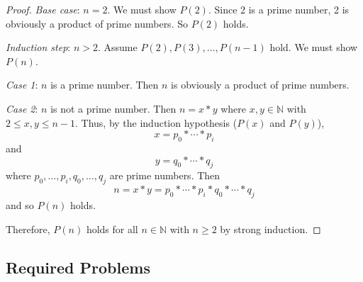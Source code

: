 \documentclass[11pt,fleqn]{article}
\begin{document}
\begin{enumerate}
\begin{proof}
\medskip

\emph{Base case}: $n = 2$.  We must show $P(2)$.  Since 2 is a prime
number, 2 is obviously a product of prime numbers.  So $P(2)$ holds.

\medskip

\emph{Induction step}: $n > 2$.  Assume $P(2), P(3), \ldots, P(n-1)$
hold.  We must show $P(n)$.

\emph{Case 1}: $n$ is a prime number.  Then $n$ is obviously a product
of prime numbers.

\emph{Case 2}: $n$ is not a prime number.  Then $n = x * y$ where $x,y
\in \mathbb{N}$ with $2 \le x,y \le n - 1$.  Thus, by the induction
hypothesis ($P(x)$ and $P(y)$), \[x = p_0 * \cdots *p_i\] and \[y =
q_0 * \cdots *q_j\] where $p_0,\ldots,p_i,q_0,\ldots,q_j$ are prime
numbers.  Then \[n = x * y = p_0 * \cdots * p_i * q_0 * \cdots * q_j\]
and so $P(n)$ holds.

\medskip

Therefore, $P(n)$ holds for all $n \in \mathbb{N}$ with $n \ge 2$ by
strong induction.
\end{proof}

\end{enumerate}

\subsection*{Required Problems}
\end{document}
